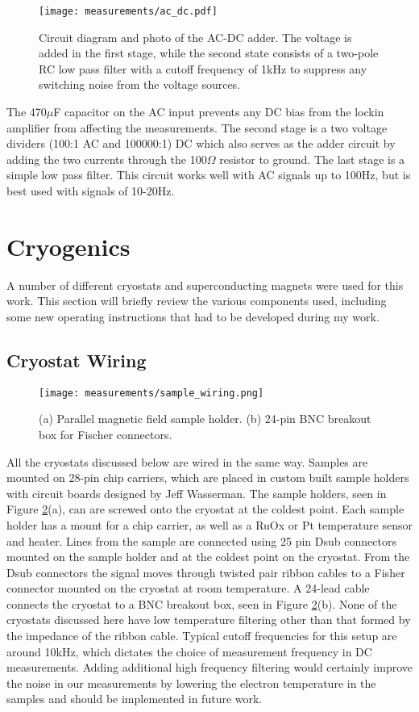 \begin{figure}
    \centering
    \texttt{[image: measurements/ac\_dc.pdf]}
    \caption{Circuit diagram and photo of the AC-DC adder. The voltage is added in the first stage, while the second state consists of a two-pole RC low pass filter with a cutoff frequency of 1kHz to suppress any switching noise from the voltage sources.}
    \label{fig:ac_dc}
\end{figure}

The 470$\mu$F capacitor on the AC input prevents any DC bias from the lockin amplifier from affecting the measurements. The second stage is a two voltage dividers (100:1 AC and 100000:1) DC which also serves as the adder circuit by adding the two currents through the 100$\Omega$ resistor to ground. The last stage is a simple low pass filter. This circuit works well with AC signals up to 100Hz, but is best used with signals of 10-20Hz.

\section{Cryogenics}

A number of different cryostats and superconducting magnets were used for this work. This section will briefly review the various components used, including some new operating instructions that had to be developed during my work.

\subsection{Cryostat Wiring}

\begin{figure}
    \centering
    \texttt{[image: measurements/sample\_wiring.png]}
    \caption{(a) Parallel magnetic field sample holder. (b) 24-pin BNC breakout box for Fischer connectors.}
    \label{fig:wiring}
\end{figure}

All the cryostats discussed below are wired in the same way. Samples are mounted on 28-pin chip carriers, which are placed in custom built sample holders with circuit boards designed by Jeff Wasserman. The sample holders, seen in Figure \ref{fig:wiring}(a), can are screwed onto the cryostat at the coldest point. Each sample holder has a mount for a chip carrier, as well as a RuOx or Pt temperature sensor and heater. Lines from the sample are connected using 25 pin Dsub connectors mounted on the sample holder and at the coldest point on the cryostat. From the Dsub connectors the signal moves through twisted pair ribbon cables to a Fisher connector mounted on the cryostat at room temperature. A 24-lead cable connects the cryostat to a BNC breakout box, seen in Figure \ref{fig:wiring}(b). None of the cryostats discussed here have low temperature filtering other than that formed by the impedance of the ribbon cable. Typical cutoff frequencies for this setup are around 10kHz, which dictates the choice of measurement frequency in DC measurements. Adding additional high frequency filtering would certainly improve the noise in our measurements by lowering the electron temperature in the samples and should be implemented in future work.

